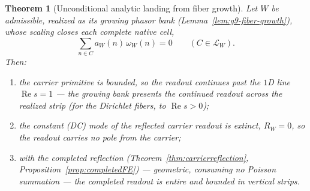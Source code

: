 \documentclass[11pt]{article}
\newtheorem{theorem}{Theorem}
\theoremstyle{definition}
\renewcommand{\Re}{\operatorname{Re}}
\begin{document}
\begin{theorem}[Unconditional analytic landing from fiber growth]\label{thm:g9-analytic-landing}
Let \(W\) be admissible, realized as its growing phasor bank
(Lemma~\ref{lem:g9-fiber-growth}), whose scaling closes each complete native cell,
\[
\sum_{n\in C}a_W(n)\,\omega_W(n)=0\qquad(C\in\mathcal L_W).
\]
Then:
\begin{enumerate}
\item[\textup{(i)}] the carrier primitive is bounded, so the readout continues
past the \(1\)D line \(\Re s=1\) --- the growing bank presents the continued
readout across the realized strip (for the Dirichlet fibers, to \(\Re s>0\));
\item[\textup{(ii)}] the constant (DC) mode of the reflected carrier readout is
extinct, \(R_W=0\), so the readout carries no pole from the carrier;
\item[\textup{(iii)}] with the completed reflection
(Theorem~\ref{thm:carrierreflection}, Proposition~\ref{prop:completedFE}) ---
geometric, consuming no Poisson summation --- the
completed readout is entire and bounded in vertical strips.
\end{enumerate}
\end{theorem}
\end{document}
